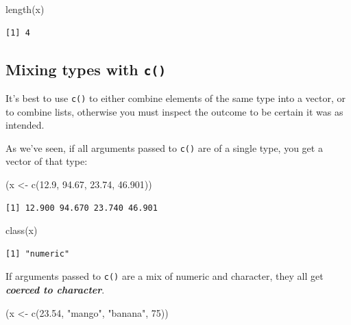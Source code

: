\documentclass[
]{book}
\newenvironment{Shaded}{\begin{snugshade}}{\end{snugshade}}
\newcommand{\DecValTok}[1]{\textcolor[rgb]{0.00,0.00,0.81}{#1}}
\newcommand{\FloatTok}[1]{\textcolor[rgb]{0.00,0.00,0.81}{#1}}
\newcommand{\FunctionTok}[1]{\textcolor[rgb]{0.00,0.00,0.00}{#1}}
\newcommand{\NormalTok}[1]{#1}
\newcommand{\OtherTok}[1]{\textcolor[rgb]{0.56,0.35,0.01}{#1}}
\newcommand{\StringTok}[1]{\textcolor[rgb]{0.31,0.60,0.02}{#1}}
\begin{document}
\begin{Shaded}
\begin{Highlighting}[]
\FunctionTok{length}\NormalTok{(x)}
\end{Highlighting}
\end{Shaded}

\begin{verbatim}
[1] 4
\end{verbatim}

\hypertarget{mixing-types-with-c}{%
\subsection{\texorpdfstring{Mixing types with \texttt{c()}}{Mixing types with c()}}\label{mixing-types-with-c}}

It's best to use \texttt{c()} to either combine elements of the same type into a vector, or to combine lists, otherwise you must inspect the outcome to be certain it was as intended.

As we've seen, if all arguments passed to \texttt{c()} are of a single type, you get a vector of that type:

\begin{Shaded}
\begin{Highlighting}[]
\NormalTok{(x }\OtherTok{\textless{}{-}} \FunctionTok{c}\NormalTok{(}\FloatTok{12.9}\NormalTok{, }\FloatTok{94.67}\NormalTok{, }\FloatTok{23.74}\NormalTok{, }\FloatTok{46.901}\NormalTok{))}
\end{Highlighting}
\end{Shaded}

\begin{verbatim}
[1] 12.900 94.670 23.740 46.901
\end{verbatim}

\begin{Shaded}
\begin{Highlighting}[]
\FunctionTok{class}\NormalTok{(x)}
\end{Highlighting}
\end{Shaded}

\begin{verbatim}
[1] "numeric"
\end{verbatim}

If arguments passed to \texttt{c()} are a mix of numeric and character, they all get \textbf{\emph{coerced to character}}.

\begin{Shaded}
\begin{Highlighting}[]
\NormalTok{(x }\OtherTok{\textless{}{-}} \FunctionTok{c}\NormalTok{(}\FloatTok{23.54}\NormalTok{, }\StringTok{"mango"}\NormalTok{, }\StringTok{"banana"}\NormalTok{, }\DecValTok{75}\NormalTok{))}
\end{Highlighting}
\end{Shaded}
\end{document}
